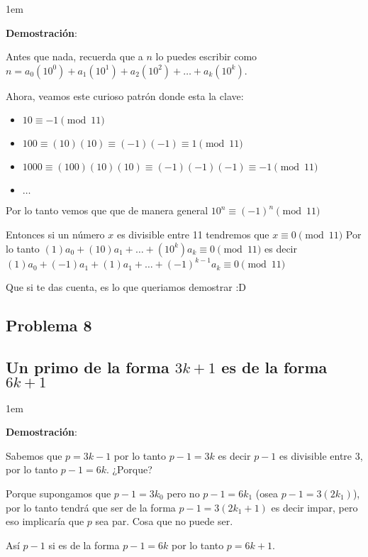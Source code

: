 \documentclass[12pt, fleqn]{article}                             %
\newenvironment{SmallIndentation}[1][0.75em]                    %
    {\begin{adjustwidth}{#1}{}\begin{footnotesize}}                 %
    {\end{footnotesize}\end{adjustwidth}}                           %
\begin{document}
        \begin{SmallIndentation}[1em]
            \textbf{Demostración}:

            Antes que nada, recuerda que a $n$ lo puedes escribir como
            $n = a_0(10^0) + a_1(10^1) + a_2(10^2) + \dots + a_k(10^k)$.

            Ahora, veamos este curioso patrón donde esta la clave:
            \begin{itemize}
                 \item $10 \equiv -1 \pmod{11}$
                 \item $100 \equiv (10)(10) \equiv (-1)(-1) \equiv 1 \pmod{11}$
                 \item $1000 \equiv (100)(10)(10) \equiv (-1)(-1)(-1) \equiv -1 \pmod{11}$
                 \item $\dots$
             \end{itemize} 

            Por lo tanto vemos que que de manera general $10^n \equiv (-1)^n \pmod{11}$

            Entonces si un número $x$ es divisible entre 11 tendremos que $x \equiv 0 \pmod{11}$
            Por lo tanto $(1)a_0 + (10)a_1 + \dots +(10^k)a_k \equiv 0 \pmod{11}$
            es decir $(1)a_0 + (-1)a_1 + (1)a_1 +\dots +(-1)^{k-1}a_k \equiv 0 \pmod{11}$

            Que si te das cuenta, es lo que queriamos demostrar :D

        \end{SmallIndentation}


    \subsection{Problema 8}
    \subsection*{Un primo de la forma $3k+1$ es de la forma $6k+1$}

        \begin{SmallIndentation}[1em]
            \textbf{Demostración}:

            Sabemos que $p = 3k-1$ por lo tanto $p-1 = 3k$ es decir $p-1$ es divisible entre
            3, por lo tanto $p-1 = 6k$.
            ¿Porque?

            Porque supongamos que $p-1=3k_0$ pero no $p-1=6k_1$ (osea $p-1=3(2k_1)$), por lo
            tanto tendrá que ser de la forma $p-1=3(2k_1+1)$ es decir impar, pero eso
            implicaría que $p$ sea par. Cosa que no puede ser.

            Así $p-1$ si es de la forma $p-1=6k$ por lo tanto $p = 6k+1$. 

        \end{SmallIndentation}
\end{document}
